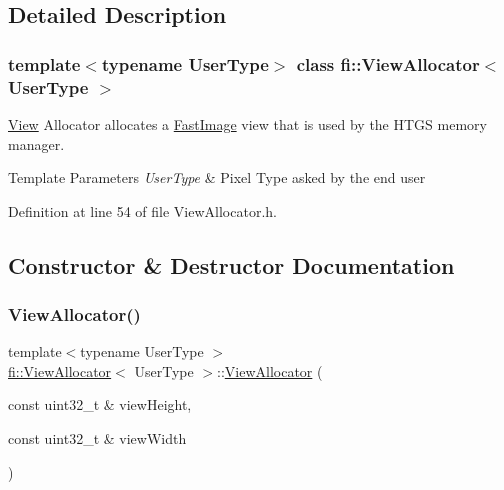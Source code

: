 \subsection{Detailed Description}
\subsubsection*{template$<$typename User\+Type$>$\newline
class fi\+::\+View\+Allocator$<$ User\+Type $>$}

\hyperlink{classfi_1_1View}{View} Allocator allocates a \hyperlink{classfi_1_1FastImage}{Fast\+Image} view that is used by the H\+T\+GS memory manager. 


\begin{DoxyTemplParams}{Template Parameters}
{\em User\+Type} & Pixel Type asked by the end user \\
\hline
\end{DoxyTemplParams}


Definition at line 54 of file View\+Allocator.\+h.



\subsection{Constructor \& Destructor Documentation}
\mbox{\label{classfi_1_1ViewAllocator_a17e386590e9c9146b804a82cd878dfe9}} 
\subsubsection{\texorpdfstring{View\+Allocator()}{ViewAllocator()}}
{\footnotesize\ttfamily template$<$typename User\+Type $>$ \\
\hyperlink{classfi_1_1ViewAllocator}{fi\+::\+View\+Allocator}$<$ User\+Type $>$\+::\hyperlink{classfi_1_1ViewAllocator}{View\+Allocator} (\begin{DoxyParamCaption}\item[{const uint32\+\_\+t \&}]{view\+Height,  }\item[{const uint32\+\_\+t \&}]{view\+Width }\end{DoxyParamCaption})\hspace{0.3cm}{\ttfamily [inline]}}



